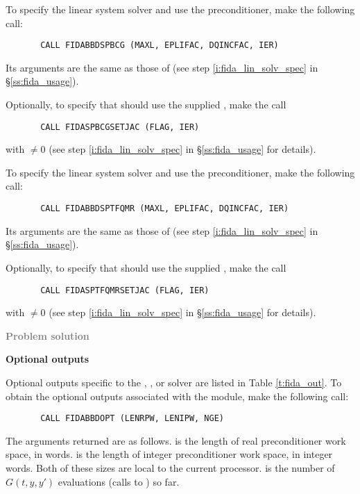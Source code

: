 \begin{Steps}
  To specify the {\spbcg} linear system solver and use the {\idabbdpre}
  preconditioner, make the following call:
\begin{verbatim}
       CALL FIDABBDSPBCG (MAXL, EPLIFAC, DQINCFAC, IER)
\end{verbatim}
  Its arguments are the same as those of 
  (see step \ref{i:fida_lin_solv_spec} in \S\ref{ss:fida_usage}).


  Optionally, to specify that {\spbcg} should use the supplied , 
  make the call
\begin{verbatim}
       CALL FIDASPBCGSETJAC (FLAG, IER)
\end{verbatim}
  with  $\neq 0$ 
  (see step \ref{i:fida_lin_solv_spec} in \S\ref{ss:fida_usage} for details).

  To specify the {\sptfqmr} linear system solver and use the {\idabbdpre}
  preconditioner, make the following call:
\begin{verbatim}
       CALL FIDABBDSPTFQMR (MAXL, EPLIFAC, DQINCFAC, IER)
\end{verbatim}
  Its arguments are the same as those of 
  (see step \ref{i:fida_lin_solv_spec} in \S\ref{ss:fida_usage}).


  Optionally, to specify that {\sptfqmr} should use the supplied , 
  make the call
\begin{verbatim}
       CALL FIDASPTFQMRSETJAC (FLAG, IER)
\end{verbatim}
  with  $\neq 0$ 
  (see step \ref{i:fida_lin_solv_spec} in \S\ref{ss:fida_usage} for details).

\item \textcolor{gray}{\bf Problem solution}
  
\item {\bf {\idabbdpre} Optional outputs}

  Optional outputs specific to the {\spgmr}, {\spbcg}, or {\sptfqmr} solver are 
  listed in Table \ref{t:fida_out}.
  To obtain the optional outputs associated with the {\idabbdpre}
  module, make the following call:
\begin{verbatim}
       CALL FIDABBDOPT (LENRPW, LENIPW, NGE)
\end{verbatim}
  The arguments returned are as follows.
   is the length of real preconditioner work space, in 
  words.   is the length of integer preconditioner work space, in
  integer words.  Both of these sizes are local to the current processor.  
  is the number of $G(t,y,y')$ evaluations (calls to ) so far.
  

\end{Steps}
